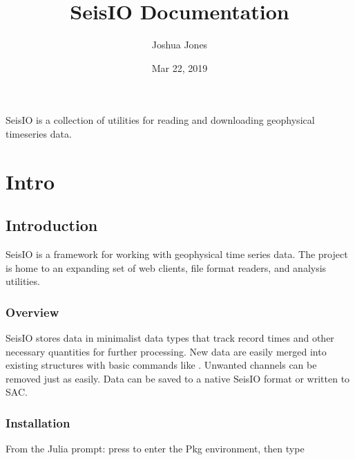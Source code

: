 \documentclass[letterpaper,11pt,english]{sphinxmanual}
\title{SeisIO Documentation}
\date{Mar 22, 2019}
\author{Joshua Jones}
\begin{document}
\pagestyle{empty}
\maketitle
\pagestyle{plain}
\sphinxtableofcontents
\pagestyle{normal}
\label{\detokenize{index::doc}}


SeisIO is a collection of utilities for reading and downloading geophysical timeseries data.


\chapter{Intro}
\label{\detokenize{index:intro}}

\section{Introduction}
\label{\detokenize{src/intro:introduction}}\label{\detokenize{src/intro::doc}}
SeisIO is a framework for working with geophysical time series data. The project is home to an expanding set of web clients, file format readers, and analysis utilities.


\subsection{Overview}
\label{\detokenize{src/intro:overview}}
SeisIO stores data in minimalist data types that track record times and other necessary quantities for further processing. New data are easily merged into existing structures with basic commands like \sphinxcode{\sphinxupquote{+}}. Unwanted channels can be removed just as easily. Data can be saved to a native SeisIO format or written to SAC.


\subsection{Installation}
\label{\detokenize{src/intro:installation}}
From the Julia prompt: press \sphinxcode{\sphinxupquote{{]}}} to enter the Pkg environment, then type

%
\begin{sphinxVerbatim}[commandchars=\\\{\}]
   
\end{sphinxVerbatim}
\end{document}
